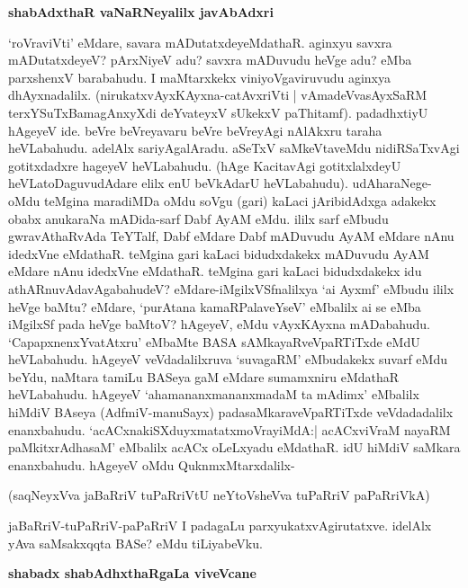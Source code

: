 \textbf{shabAdxthaR vaNaRNeyalilx javAbAdxri}

`roVraviVti' eMdare, savara mADutatxdeyeMdathaR. aginxyu savxra 
mADutatxdeyeV? pArxNiyeV adu? savxra mADuvudu heVge adu? eMba 
parxshenxV barabahudu. I maMtarxkekx viniyoVgaviruvudu aginxya 
dhAyxnadalilx. (nirukatxvAyxKAyxna-catAvxriVti | vAmadeVvasAyxSaRM 
terxYSuTxBamagAnxyXdi deYvateyxV sUkekxV paThitamf). padadhxtiyU hAgeyeV ide. beVre beVreyavaru beVre beVreyAgi nAlAkxru taraha heVLabahudu. adelAlx sariyAgalAradu. aSeTxV saMkeVtaveMdu nidiRSaTxvAgi gotitxdadxre hageyeV heVLabahudu. (hAge KacitavAgi gotitxlalxdeyU heVLatoDaguvudAdare elilx enU beVkAdarU heVLabahudu). udAharaNege-oMdu teMgina maradiMDa oMdu soVgu (gari) kaLaci jAribidAdxga adakekx obabx anukaraNa mADida-sarf Dabf AyAM eMdu. ililx sarf eMbudu gwravAthaRvAda TeYTalf, Dabf eMdare Dabf mADuvudu AyAM eMdare nAnu idedxVne eMdathaR. teMgina gari kaLaci bidudxdakekx mADuvudu AyAM eMdare nAnu idedxVne eMdathaR. teMgina gari kaLaci bidudxdakekx idu athARnuvAdavAgabahudeV? eMdare-iMgilxVSfnalilxya `ai Ayxmf' eMbudu ililx heVge baMtu? eMdare, `purAtana kamaRPalaveYseV' eMbalilx ai se eMba iMgilxSf pada heVge baMtoV? hAgeyeV, eMdu vAyxKAyxna mADabahudu. `CapapxnenxYvatAtxru' eMbaMte BASA sAMkayaRveVpaRTiTxde eMdU heVLabahudu. hAgeyeV veVdadalilxruva `suvagaRM' eMbudakekx suvarf eMdu beYdu, naMtara tamiLu BASeya gaM eMdare sumamxniru eMdathaR heVLabahudu. hAgeyeV `ahamananxmananxmadaM ta mAdimx' eMbalilx hiMdiV BAseya (AdfmiV-manuSayx) padasaMkaraveVpaRTiTxde veVdadadalilx enanxbahudu. `acACxnakiSXduyxmatatxmoVrayiMdA:| acACxviVraM nayaRM paMkitxrAdhasaM' eMbalilx acACx oLeLxyadu eMdathaR. idU hiMdiV saMkara enanxbahudu. hAgeyeV oMdu QuknmxMtarxdalilx-

(saqNeyxVva jaBaRriV tuPaRriVtU neYtoVsheVva tuPaRriV paPaRriVkA)

jaBaRriV-tuPaRriV-paPaRriV I padagaLu parxyukatxvAgirutatxve. idelAlx yAva saMsakxqqta BASe? eMdu tiLiyabeVku.

\textbf{shabadx shabAdhxthaRgaLa viveVcane}

